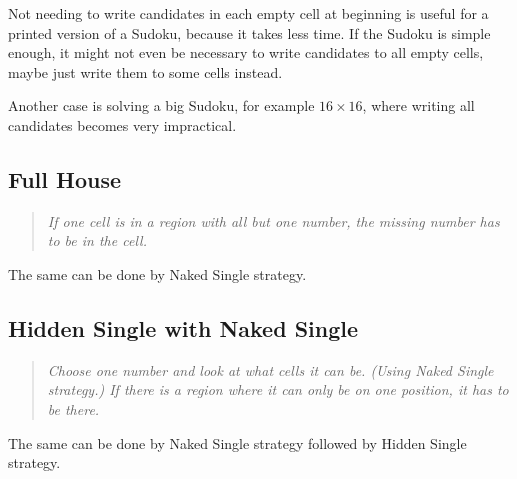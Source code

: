 Not needing to write candidates in each empty cell at beginning is useful
for a printed version of a Sudoku, because it takes less time.
If the Sudoku is simple enough, it might not even be necessary to write candidates to all empty cells,
maybe just write them to some cells instead.

Another case is solving a big Sudoku, for example $16 \times 16$,
where writing all candidates becomes very impractical.

\subsection*{Full House}

\begin{quote}
    \textit{
        If one cell is in a region with all but one number, the missing number has to be in the cell.
    }
\end{quote}

The same can be done by Naked Single strategy.


\subsection*{Hidden Single with Naked Single}

\begin{quote}
    \textit{
        Choose one number and look at what cells it can be. (Using Naked Single strategy.)
        If there is a region where it can only be on one position, it has to be there.
    }
\end{quote}

The same can be done by Naked Single strategy followed by Hidden Single strategy.

